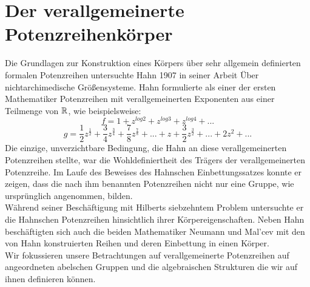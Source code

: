 %
% 
%
%
%
%
%
\section{Der verallgemeinerte Potenzreihenkörper}
%
Die Grundlagen zur Konstruktion eines Körpers über sehr allgemein definierten formalen Potenzreihen untersuchte Hahn 1907 in seiner Arbeit \glqq Über nichtarchimedische Größensysteme\grqq. 
Hahn formulierte als einer der ersten Mathematiker Potenzreihen mit verallgemeinerten Exponenten aus einer Teilmenge von $\mathbb{R}$, wie beispielsweise:\\
\[ f = 1 + z^{log 2} + z^{log 3} + z^{log 4} + ... \]
\[g = \frac{1}{2}z^{\frac{1}{2}} + \frac{3}{4}z^\frac{3}{4} + \frac{7}{8}z^\frac{7}{8} + ... + z + \frac{3}{2}z^\frac{3}{2} + ... + 2z^2 + ...\] 
Die einzige, unverzichtbare Bedingung, die Hahn an diese verallgemeinerten Potenzreihen stellte, war die Wohldefiniertheit des Trägers der verallgemeinerten Potenzreihe.
Im Laufe des Beweises des Hahnschen Einbettungssatzes konnte er zeigen, dass die nach ihm benannten Potenzreihen nicht nur eine Gruppe, wie ursprünglich angenommen, bilden. \\ Während seiner Beschäftigung mit Hilberts siebzehntem Problem untersuchte er die Hahnschen Potenzreihen hinsichtlich ihrer Körpereigenschaften. Neben Hahn beschäftigten sich auch die beiden Mathematiker Neumann und Mal'cev mit den von Hahn konstruierten Reihen und deren Einbettung in einen Körper. \\
Wir fokussieren unsere Betrachtungen auf verallgemeinerte Potenzreihen auf angeordneten abelschen Gruppen und die algebraischen Strukturen die wir auf ihnen definieren können. 

